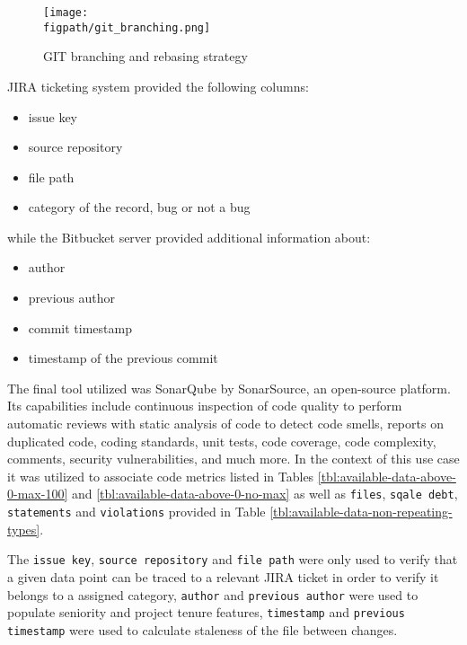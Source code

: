 \begin{figure}[!h]
    \centering
    \texttt{[image: \\figpath/git\_branching.png]}
    \caption{GIT branching and rebasing strategy}
    \label{fig:git-branching-merging-and-rebasing}
\end{figure}

JIRA ticketing system provided the following columns:
\begin{itemize}
    \item issue key
    \item source repository
    \item file path
    \item category of the record, bug or not a bug
\end{itemize}

while the Bitbucket server provided additional information about:
\begin{itemize}
    \item author
    \item previous author
    \item commit timestamp
    \item timestamp of the previous commit
\end{itemize}

The final tool utilized was SonarQube by SonarSource, an open-source platform. Its capabilities include continuous inspection of code quality to perform automatic reviews with static analysis of code to detect code smells, reports on duplicated code, coding standards, unit tests, code coverage, code complexity, comments,  security vulnerabilities, and much more. In the context of this use case it was utilized to associate code metrics listed in Tables \ref{tbl:available-data-above-0-max-100} and \ref{tbl:available-data-above-0-no-max} as well as \texttt{files}, \texttt{sqale debt}, \texttt{statements} and \texttt{violations} provided in Table \ref{tbl:available-data-non-repeating-types}.

The \texttt{issue key}, \texttt{source repository} and \texttt{file path} were only used to verify that a given data point can be traced to a relevant JIRA ticket in order to verify it belongs to a assigned category, \texttt{author} and \texttt{previous author} were used to populate seniority and project tenure features, \texttt{timestamp} and \texttt{previous timestamp} were used to calculate staleness of the file between changes.



